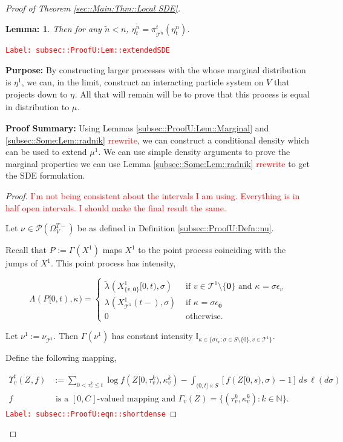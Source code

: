 \documentclass[12pt]{article}
\newcommand{\mb}{\mathbb}
\newcommand{\mc}{\mathcal}
\newcommand{\te}{\text}
\newcommand{\ep}{\epsilon}
\newcommand{\tr}{\textcolor{red}}
\newcommand{\labe}[1]{\tr{\texttt{Label: #1}}}
\newcommand{\purpose}{\textbf{Purpose: }}
\newcommand{\pfsum}{\textbf{Proof Summary: }}
\newcommand{\ind}{\hspace{24pt}}
\newcommand{\defeq}{:=}								%
\newcommand{\pmsr}{\mc{P}}							%
\renewcommand{\root}{\mathbf{0}}				%
\renewcommand{\v}{v}							%
\renewcommand{\S}{S}							%
\newcommand{\s}{\sigma}							%
\newcommand{\ev}[1]{\ep_{#1}}					%
\newcommand{\T}{T}								%
\newcommand{\OmegaV}[2]{\Omega_{#1}^{#2}}		%
\renewcommand{\t}{t}							%
\newcommand{\pup}[1]{^{#1}}							%
\newcommand{\tree}{\mc{T}}							%
\newcommand{\V}{V}									%
\renewcommand{\tt}{s}								%
\newcommand{\rt}[1]{\tau^{#1}}						%
\renewcommand{\it}{k}								%
\newcommand{\numb}{n}								%
\newcommand{\piV}[2]{\pi_{#1}^{#2}}					%
\newcommand{\rxvtn}[3]{X_{#1}^{#3}(#2)}				%
\newcommand{\rxvtsn}[3]{X_{#1}^{#3}{#2}}			%
\newcommand{\rxvttts}[2]{Z_{#1}{#2}}				%
\newcommand{\rp}[1]{P^{#1}}							%
\newcommand{\m}[3]{\mu_{#2#1}^{#3}}						%
\newcommand{\mm}[3]{\nu_{#2#1}^{#3}}						%
\newcommand{\mmm}[3]{\eta_{#2#1}^{#3}}						%
\newcommand{\rate}[1]{\lambda_{#1}}					%
\newcommand{\ratee}[1]{\Lambda_{#1}}				%
\newcommand{\crate}[2]{\alt{\lambda}_{#1}^{#2}}		%
\newcommand{\const}[1]{C_{#1}}						%
\newcommand{\Sm}{\ell}								%
\newcommand{\alt}{\widetilde}						%
\renewcommand{\mark}[1]{\kappa^{#1}}				%
\newcommand{\ds}[2]{\Upsilon_{#1}^{#2}}			%
\newcommand{\pmap}[1]{\Gamma_{#1}}				%
\newtheorem{lem}[thms]{Lemma: }
\begin{document}
\begin{proof}[Proof of Theorem \ref{sec::Main:Thm::Local SDE}]
\begin{lem}
Then for any \(\alt{\numb} < \numb\), \(\mmm{}{\t}{\alt{\numb}} = \piV{\tree\pup{\alt{\numb}}}{\t}(\mmm{}{\t}{\numb})\).
\label{subsec::ProofU:Lem::extendedSDE}
\end{lem}
\labe{subsec::ProofU:Lem::extendedSDE}

\purpose By constructing larger processes with the whose marginal distribution is \(\mmm{}{}{1}\), we can, in the limit, construct an interacting particle system on \(V\) that projects down to \(\mmm{}{}{}\). All that will remain will be to prove that this process is equal in distribution to \(\m{}{}{}\).

\pfsum Using Lemmas \ref{subsec::ProofU:Lem::Marginal} and \ref{subsec::Some:Lem::radnik} \tr{rrewrite}, we can construct a conditional density which can be used to extend \(\mu\pup{1}\). We can use simple density arguments to prove the marginal properties we can use Lemma \ref{subsec::Some:Lem::radnik} \tr{rrewrite} to get the SDE formulation.

\begin{proof}
\tr{I'm not being consistent about the intervals I am using. Everything is in half open intervals. I should make the final result the same.}

Let \(\mm{}{}{} \in \pmsr(\OmegaV{\V}{\T-})\) be as defined in Definition \ref{subsec::ProofU:Defn::nu}.

\ind Recall that \(\rp{} \defeq \pmap{}(\rxvtsn{}{}{1})\) maps \(\rxvtsn{}{}{1}\) to the point process coinciding with the jumps of \(\rxvtsn{}{}{1}\). This point process has intensity,

\[\ratee{}(\rp{}[0,\t),\mark{}) = \begin{cases}
\crate{}{}(\rxvtsn{\{\v,\root\}}{[0,\t)}{1},\s) &\te{ if } \v\in \tree\pup{1}\setminus\{\root\}\te{ and } \mark{} = \s\ev{\v}\\
\rate{}(\rxvtn{\tree\pup{1}}{\t-}{1},\s) &\te{ if } \mark{} = \s\ev{\root}\\
0 &\te{ otherwise}.
\end{cases}\]

Let \(\mm{}{}{1} \defeq \mm{\tree\pup{1}}{}{}\). Then \(\pmap{}(\mm{}{}{1})\) has constant intensity \(\mb{I}_{\kappa \in\{\s\ev{\v}:\s\in\S\setminus\{0\},\v\in\tree\pup{1}\}}\). 

\ind Define the following mapping,

\begin{align}
\ds{\v}{\t}(\rxvttts{}{},f) &\defeq \sum_{0 < \rt{\it}_\v \leq \t} \log{f(\rxvttts{}{[0,\rt{\it}_\v)},\mark{\it}_\v)} - \int_{(0,\t]\times \S} [f(\rxvttts{}{[0,\tt)},\s) - 1]\,ds\,\Sm(d\s) \label{subsec::ProofU:eqn::shortdense}\\
f&\te{ is a }[0,\const{}] \te{-valued mapping and } \pmap{\v}(\rxvttts{}{}) = \{(\rt{\it}_\v,\mark{\it}_\v):\it\in\mb{N}\}.\nonumber
\end{align} 
\labe{subsec::ProofU:eqn::shortdense}


\end{proof}
\end{proof}
\end{document}
